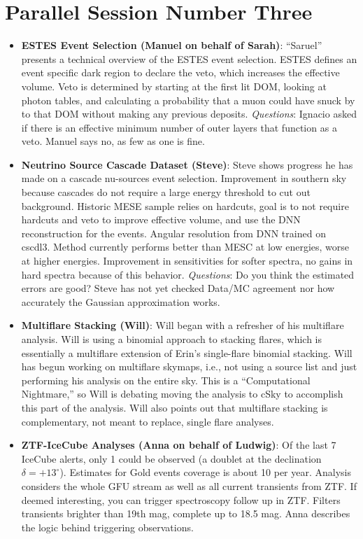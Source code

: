 \section{Parallel Session Number Three}
\begin{itemize}
    \item \textbf{ESTES Event Selection (Manuel on behalf of Sarah)}: ``Saruel'' presents a technical overview of the ESTES event selection. ESTES defines an event specific dark region to declare the veto, which increases the effective volume. Veto is determined by starting at the first lit DOM, looking at photon tables, and calculating a probability that a muon could have snuck by to that DOM without making any previous deposits. \emph{Questions}: Ignacio asked if there is an effective minimum number of outer layers that function as a veto. Manuel says no, as few as one is fine.
    \item \textbf{Neutrino Source Cascade Dataset (Steve)}: Steve shows progress he has made on a cascade nu-sources event selection. Improvement in southern sky because cascades do not require a large energy threshold to cut out background. Historic MESE sample relies on hardcuts, goal is to not require hardcuts and veto to improve effective volume, and use the DNN reconstruction for the events. Angular resolution from DNN trained on cscdl3. Method currently performs better than MESC at low energies, worse at higher energies. Improvement in sensitivities for softer spectra, no gains in hard spectra because of this behavior. \emph{Questions}: Do you think the estimated errors are good? Steve has not yet checked Data/MC agreement nor how accurately the Gaussian approximation works.
    \item \textbf{Multiflare Stacking (Will)}: Will began with a refresher of his multiflare analysis. Will is using a binomial approach to stacking flares, which is essentially a multiflare extension of Erin's single-flare binomial stacking. Will has begun working on multiflare skymaps, i.e., not using a source list and just performing his analysis on the entire sky. This is a ``Computational Nightmare,'' so Will is debating moving the analysis to cSky to accomplish this part of the analysis. Will also points out that multiflare stacking is complementary, not meant to replace, single flare analyses.
    \item \textbf{ZTF-IceCube Analyses (Anna on behalf of Ludwig)}: Of the last 7 IceCube alerts, only 1 could be observed (a doublet at the declination $\delta = +13^{\circ}$). Estimates for Gold events coverage is about 10 per year. Analysis considers the whole GFU stream as well as all current transients from ZTF. If deemed interesting, you can trigger spectroscopy follow up in ZTF. Filters transients brighter than 19th mag, complete up to 18.5 mag. Anna describes the logic behind triggering observations.

\end{itemize}
